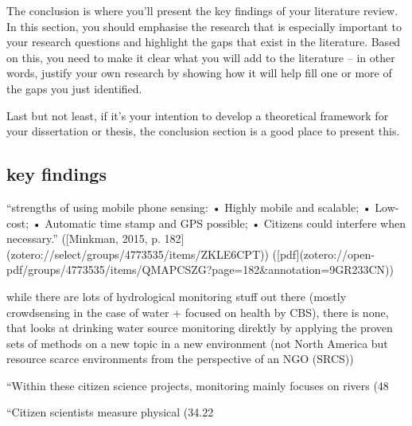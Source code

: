 {The conclusion is where you’ll present the key findings of your literature review. In this section, you should emphasise the research that is especially important to your research questions and highlight the gaps that exist in the literature. Based on this, you need to make it clear what you will add to the literature – in other words, justify your own research by showing how it will help fill one or more of the gaps you just identified.

Last but not least, if it’s your intention to develop a theoretical framework for your dissertation or thesis, the conclusion section is a good place to present this.

\subsection{key findings}

“strengths of using mobile phone sensing: • Highly mobile and scalable; • Low-cost; • Automatic time stamp and GPS possible; • Citizens could interfere when necessary.” ([Minkman, 2015, p. 182](zotero://select/groups/4773535/items/ZKLE6CPT)) ([pdf](zotero://open-pdf/groups/4773535/items/QMAPCSZG?page=182&annotation=9GR233CN))



while there are lots of hydrological monitoring stuff out there (mostly crowdsensing in the case of water + focused on health by CBS), there is none, that looks at drinking water source monitoring direktly by applying the proven sets of methods on a new topic in a new environment (not North America but resource scarce environments from the perspective of an NGO (SRCS)) 


“Within these citizen science projects, monitoring mainly focuses on rivers (48%

“Citizen scientists measure physical (34.22%

}
